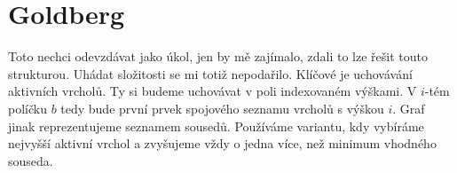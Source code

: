 \documentclass[a4paper]{article}
\begin{document}
\renewcommand{\headrulewidth}{0pt} %
\thispagestyle{fancy} %
{}

\section*{Goldberg}
Toto nechci odevzdávat jako úkol, jen by mě zajímalo, zdali to lze řešit touto strukturou. Uhádat složitosti se mi totiž nepodařilo. Klíčové je uchovávání aktivních vrcholů. Ty si budeme uchovávat v poli indexovaném výškami. V $i$-tém políčku $b$ tedy bude první prvek spojového seznamu vrcholů s výškou $i$. Graf jinak reprezentujeme seznamem sousedů. Používáme variantu, kdy vybíráme nejvyšší aktivní vrchol a zvyšujeme vždy o jedna více, než minimum vhodného souseda.
\end{document}
